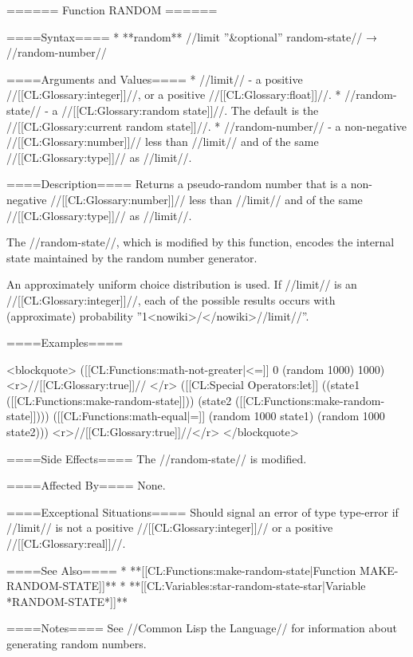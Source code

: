 ====== Function RANDOM ======

====Syntax====
  * **random** //limit ''&optional'' random-state// → //random-number//

====Arguments and Values====
  * //limit// - a positive //[[CL:Glossary:integer]]//, or a positive //[[CL:Glossary:float]]//.
  * //random-state// - a //[[CL:Glossary:random state]]//. The default is the //[[CL:Glossary:current random state]]//.
  * //random-number// - a non-negative //[[CL:Glossary:number]]// less than //limit// and of the same //[[CL:Glossary:type]]// as //limit//.

====Description====
Returns a pseudo-random number that is a non-negative //[[CL:Glossary:number]]// less than //limit// and of the same //[[CL:Glossary:type]]// as //limit//.

The //random-state//, which is modified by this function, encodes the internal state maintained by the random number generator.

An approximately uniform choice distribution is used. If //limit// is an //[[CL:Glossary:integer]]//, each of the possible results occurs with (approximate) probability ''1<nowiki>/</nowiki>//limit//''.

====Examples====

<blockquote> 
([[CL:Functions:math-not-greater|<=]] 0 (random 1000) 1000) <r>//[[CL:Glossary:true]]// </r>
([[CL:Special Operators:let]] ((state1 ([[CL:Functions:make-random-state]])) 
      (state2 ([[CL:Functions:make-random-state]])))
  ([[CL:Functions:math-equal|=]] (random 1000 state1) (random 1000 state2))) <r>//[[CL:Glossary:true]]//</r>
</blockquote>

====Side Effects====
The //random-state// is modified.

====Affected By====
None.

====Exceptional Situations====
Should signal an error of type type-error if //limit// is not a positive //[[CL:Glossary:integer]]// or a positive //[[CL:Glossary:real]]//.

====See Also====
  * **[[CL:Functions:make-random-state|Function MAKE-RANDOM-STATE]]**
  * **[[CL:Variables:star-random-state-star|Variable *RANDOM-STATE*]]**

====Notes====
See //Common Lisp the Language// for information about generating random numbers.

